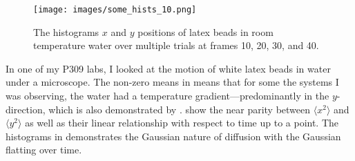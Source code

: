 \begin{figure}[htbp]
    \centering
    \texttt{[image: images/some\_hists\_10.png]}
    \caption{The histograms $x$ and $y$ positions of latex beads in room temperature water over multiple trials at frames 10, 20, 30, and 40.
    }
    \label{fig:some_hists}
\end{figure}

In one of my P309 labs, I looked at the motion of white latex beads in water under a microscope. The non-zero means in  means that for some the systems I was observing, the water had a temperature gradient---predominantly in the $y$-direction, which is also demonstrated by .  show the near parity between $\langle x^2\rangle$ and $\langle y^2\rangle$ as well as their linear relationship with respect to time up to a point. The histograms in  demonstrates the Gaussian nature of diffusion with the Gaussian flatting over time.

